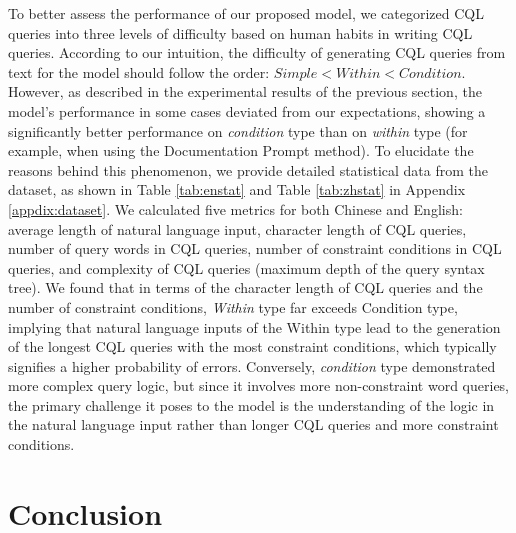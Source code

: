 \documentclass[11pt]{article}
\begin{document}
\begin{CJK*}{UTF8}{gbsn}
To better assess the performance of our proposed model, we categorized CQL queries into three levels of difficulty based on human habits in writing CQL queries. According to our intuition, the difficulty of generating CQL queries from text for the model should follow the order: $Simple < Within < Condition$. However, as described in the experimental results of the previous section, the model's performance in some cases deviated from our expectations, showing a significantly better performance on \emph{condition} type than on \emph{within} type (for example, when using the Documentation Prompt method). To elucidate the reasons behind this phenomenon, we provide detailed statistical data from the dataset, as shown in Table \ref{tab:enstat} and Table \ref{tab:zhstat} in Appendix \ref{appdix:dataset}. We calculated five metrics for both Chinese and English: average length of natural language input, character length of CQL queries, number of query words in CQL queries, number of constraint conditions in CQL queries, and complexity of CQL queries (maximum depth of the query syntax tree). We found that in terms of the character length of CQL queries and the number of constraint conditions, \emph{Within} type far exceeds Condition type, implying that natural language inputs of the Within type lead to the generation of the longest CQL queries with the most constraint conditions, which typically signifies a higher probability of errors. Conversely, \emph{condition} type demonstrated more complex query logic, but since it involves more non-constraint word queries, the primary challenge it poses to the model is the understanding of the logic in the natural language input rather than longer CQL queries and more constraint conditions.



\section{Conclusion}


\end{CJK*}
\end{document}
